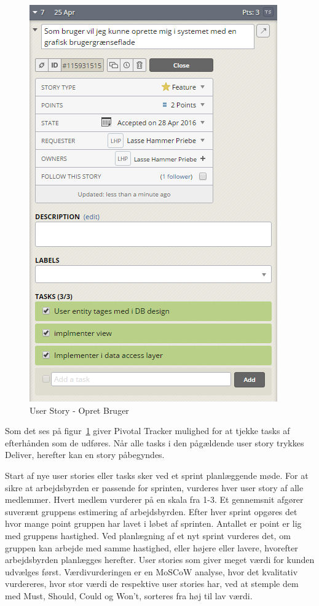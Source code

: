 \begin{figure}
	\centering
	\includegraphics[width=0.6\linewidth]{figs/processProjektGennemforsel/userstory_with_tasks.PNG}
	\caption{User Story - Opret Bruger}
	\label{fig:userstory_with_tasks}
\end{figure}

Som det ses på figur~\ref{fig:userstory_with_tasks} giver Pivotal Tracker mulighed for at tjekke tasks af efterhånden som de udføres. Når alle tasks i den pågældende user story trykkes Deliver, herefter kan en story påbegyndes. 

Start af nye user stories eller tasks sker ved et sprint planlæggende møde. For at sikre at arbejdsbyrden er passende for sprinten, vurderes hver user story af alle medlemmer. Hvert medlem vurderer på en skala fra 1-3. Et gennemsnit afgører suverænt gruppens estimering af arbejdsbyrden. Efter hver sprint opgøres det hvor mange point gruppen har lavet i løbet af sprinten. Antallet er point er lig med gruppens hastighed. Ved planlægning af et nyt sprint vurderes det, om gruppen kan arbejde med samme hastighed, eller højere eller lavere, hvorefter arbejdsbyrden planlægges herefter. User stories som giver meget værdi for kunden udvælges først. Værdivurderingen er en MoSCoW analyse, hvor det kvalitativ vurdereres, hvor stor værdi de respektive user stories har, ved at stemple dem med Must, Should, Could og Won't, sorteres fra høj til lav værdi.  

